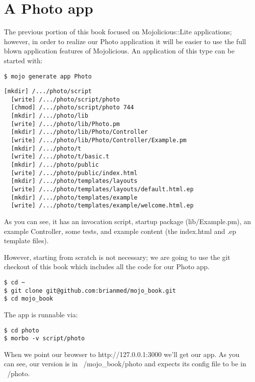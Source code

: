 \documentclass[14pt]{extreport}
\begin{document}
\section{A Photo app}

The previous portion of this book focused on Mojolicious::Lite applications;
however, in order to realize our Photo application it will be easier to use the
full blown application features of Mojolicious.  An application of this type
can be started with:

\begin{lstlisting}[style=BashInputStyle]
$ mojo generate app Photo
\end{lstlisting}

\begin{lstlisting}[style=BashOutputStyle]
  [mkdir] /.../photo/script
  [write] /.../photo/script/photo
  [chmod] /.../photo/script/photo 744
  [mkdir] /.../photo/lib
  [write] /.../photo/lib/Photo.pm
  [mkdir] /.../photo/lib/Photo/Controller
  [write] /.../photo/lib/Photo/Controller/Example.pm
  [mkdir] /.../photo/t
  [write] /.../photo/t/basic.t
  [mkdir] /.../photo/public
  [write] /.../photo/public/index.html
  [mkdir] /.../photo/templates/layouts
  [write] /.../photo/templates/layouts/default.html.ep
  [mkdir] /.../photo/templates/example
  [write] /.../photo/templates/example/welcome.html.ep
\end{lstlisting}

As you can see, it has an invocation script, startup package (lib/Example.pm),
an example Controller, some tests, and example content (the index.html and .ep
template files).

However, starting from scratch is not necessary; we are going to use the git
checkout of this book which includes all the code for our Photo app.

\begin{lstlisting}[style=BashOutputStyle]
$ cd ~
$ git clone git@github.com:brianmed/mojo_book.git
$ cd mojo_book
\end{lstlisting}

The app is runnable via:

\begin{lstlisting}[style=BashInputStyle]
$ cd photo
$ morbo -v script/photo
\end{lstlisting}

When we point our browser to http://127.0.0.1:3000 we'll get our app.  As you
can see, our version is in ~/mojo\_book/photo and expects its config file to
be in ~/photo.
\end{document}
